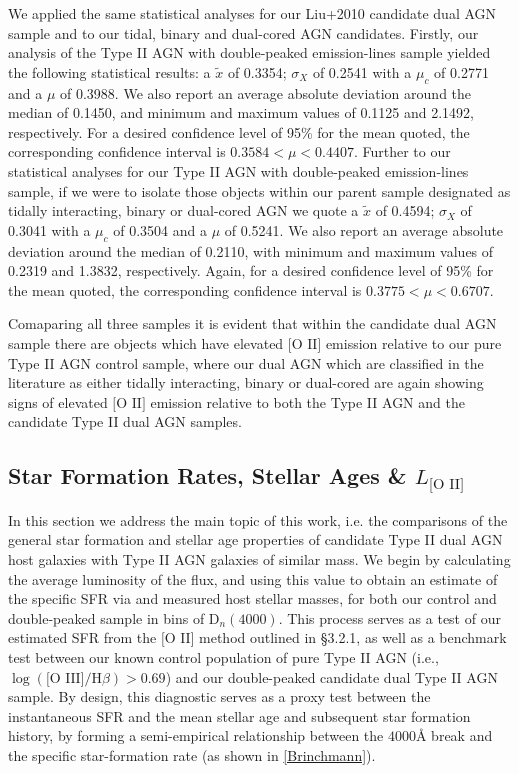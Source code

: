 We applied the same statistical analyses for our Liu+2010 candidate dual AGN sample and to our tidal, binary and dual-cored AGN candidates. Firstly, our analysis of the Type II AGN with double-peaked emission-lines sample yielded the following statistical results: a $\tilde{x}$ of 0.3354; $\sigma_{X}$ of 0.2541 with a $\mu_{c}$ of 0.2771 and a $\mu$ of 0.3988. We also report an average absolute deviation around the median of 0.1450, and minimum and maximum values of 0.1125 and 2.1492, respectively. For a desired confidence level of 95\% for the mean quoted, the corresponding confidence interval is ${0.3584}<{\mu}<{0.4407}$. Further to our statistical analyses for our Type II AGN with double-peaked emission-lines sample, if we were to isolate those objects within our parent sample designated as tidally interacting, binary or dual-cored AGN we quote a $\tilde{x}$ of 0.4594; $\sigma_{X}$ of 0.3041 with a $\mu_{c}$ of 0.3504 and a $\mu$ of 0.5241. We also report an average absolute deviation around the median of 0.2110, with minimum and maximum values of 0.2319 and 1.3832, respectively. Again, for a desired confidence level of 95\% for the mean quoted, the corresponding confidence interval is ${0.3775}<{\mu}<{0.6707}$.

Comaparing all three samples it is evident that within the candidate dual AGN sample there are objects which have elevated $\text{[O II]}$ emission relative to our pure Type II AGN control sample, where our dual AGN which are classified in the literature as either tidally interacting, binary or dual-cored are again showing signs of elevated $\text{[O II]}$ emission relative to both the Type II AGN and the candidate Type II dual AGN samples.

\subsection{Star Formation Rates, Stellar Ages \& $L_{\text{[O II]}}$}

In this section we address the main topic of this work, i.e. the comparisons of the general star formation and stellar age properties of candidate Type II dual AGN host galaxies with Type II AGN galaxies of similar mass. We begin by calculating the average luminosity of the \text{[O II]} flux, and using this value to obtain an estimate of the specific SFR via \label{eq:Kewley} and measured host stellar masses, for both our control and double-peaked sample in bins of $\text{D}_n(4000)$. This process serves as a test of our estimated SFR from the $\text{[O II]}$ method outlined in §3.2.1, as well as a benchmark test between our known control population of pure Type II AGN (i.e., $\log{(\text{[O III]}/\text{H}\beta)}>{0.69}$) and our double-peaked candidate dual Type II AGN sample. By design, this diagnostic serves as a proxy test between the instantaneous SFR and the mean stellar age and subsequent star formation history, by forming a semi-empirical relationship between the $4000Å$ break and the specific star-formation rate (as shown in \ref{Brinchmann}).   

